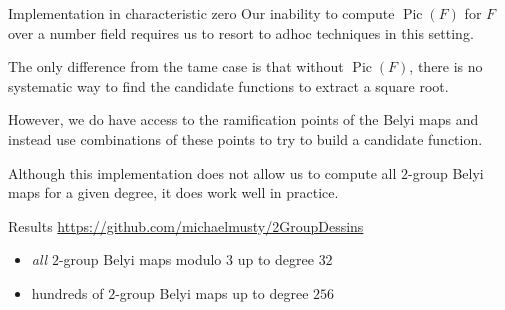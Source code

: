 \documentclass[xcolor=dvipsnames]{beamer}
\theoremstyle{plain}
\DeclareMathOperator{\Pic}{Pic}
\begin{document}
{\begin{frame}{Implementation in characteristic zero}
      Our inability to compute $\Pic(F)$
      for $F$ over a number field requires
      us to resort to adhoc techniques in this setting.
      \pause\par
      The only difference from the tame case is that
      without $\Pic(F)$, there is no systematic way
      to find the candidate functions to extract
      a square root.
      \pause\par
      However, we do have access to the ramification points
      of the Belyi maps and instead use combinations
      of these points to try to build a candidate function.
      \pause\par
      Although this implementation does not allow us
      to compute all $2$-group Belyi maps for a given
      degree, it does work well in practice.
    \end{frame}
    \begin{frame}{Results}
        \url{https://github.com/michaelmusty/2GroupDessins}
      \begin{itemize}
        \item
          \emph{all} $2$-group Belyi maps modulo $3$ up to degree $32$
        \item
          hundreds of $2$-group Belyi maps up to degree $256$
      \end{itemize}
    \end{frame}
  }
\end{document}
